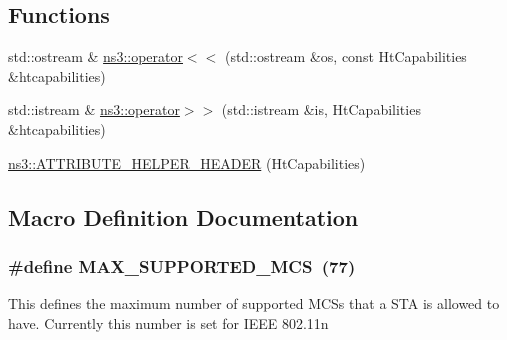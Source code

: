 \subsection*{Functions}
\begin{DoxyCompactItemize}
\item 
std\+::ostream \& \hyperlink{namespacens3_ae608ccb16fe4813a35f5b630ec934c2e}{ns3\+::operator$<$$<$} (std\+::ostream \&os, const Ht\+Capabilities \&htcapabilities)
\item 
std\+::istream \& \hyperlink{namespacens3_a45c708b54a352ab44ae5dcfdbc7a315a}{ns3\+::operator$>$$>$} (std\+::istream \&is, Ht\+Capabilities \&htcapabilities)
\item 
\hyperlink{namespacens3_a053e7b9ef6951b0ec26fbdea3f0de354}{ns3\+::\+A\+T\+T\+R\+I\+B\+U\+T\+E\+\_\+\+H\+E\+L\+P\+E\+R\+\_\+\+H\+E\+A\+D\+ER} (Ht\+Capabilities)
\end{DoxyCompactItemize}


\subsection{Macro Definition Documentation}
\subsubsection[{\texorpdfstring{M\+A\+X\+\_\+\+S\+U\+P\+P\+O\+R\+T\+E\+D\+\_\+\+M\+CS}{MAX_SUPPORTED_MCS}}]{\setlength{\rightskip}{0pt plus 5cm}\#define M\+A\+X\+\_\+\+S\+U\+P\+P\+O\+R\+T\+E\+D\+\_\+\+M\+CS~(77)}\hypertarget{ht-capabilities_8h_a309e0519adb78c8fe6aed48ca762e21e}{}\label{ht-capabilities_8h_a309e0519adb78c8fe6aed48ca762e21e}
This defines the maximum number of supported M\+C\+Ss that a S\+TA is allowed to have. Currently this number is set for I\+E\+EE 802.\+11n 